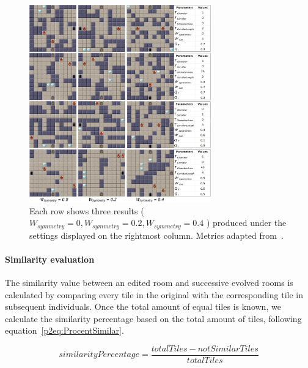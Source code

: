 \begin{figure}
\centering
\includegraphics[width=0.7\textwidth]{included-papers-tex/paper-2/pap2-figures/symmetry-result-figuer.png}
\caption{Each row shows three results (\(W_{symmetry}=0, W_{symmetry}=0.2, W_{symmetry}=0.4\) ) produced under the settings displayed on the rightmost column. Metrics adapted from~\protect{}.}
\label{p2fig:symmetry-result}
\end{figure}

\paragraph{Similarity evaluation}

The similarity value between an edited room and successive evolved rooms is calculated by comparing every tile in the original with the corresponding tile in subsequent individuals. Once the total amount of equal tiles is known, we calculate the similarity percentage based on the total amount of tiles, following equation~\ref{p2eq:ProcentSimilar}. 

\begin{equation} \label{p2eq:ProcentSimilar}
similarityPercentage = \frac{totalTiles - notSimilarTiles} {totalTiles}
\end{equation}


